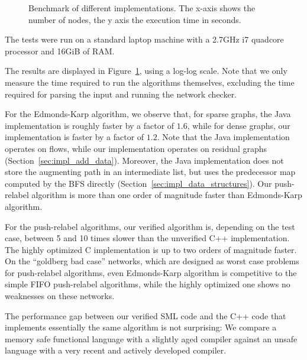 \documentclass[smallcondensed]{svjour3}     %
\begin{document}
\begin{figure}[!h]
\begin{center}
\end{center}
\caption{Benchmark of different implementations. The x-axis shows the number of nodes, the y axis the execution time in seconds.}\label{fig:benchmark}
\end{figure}


  The tests were run on a standard laptop machine with a 2.7GHz i7 quadcore processor and 16GiB of RAM.
  
  The results are displayed in Figure~\ref{fig:benchmark}, using a log-log scale.
  Note that we only measure the time required to run the algorithms themselves, excluding the time required for parsing the input and running the network checker.
  
  For the Edmonds-Karp algorithm, we observe that, for sparse graphs, the Java implementation is roughly faster by a factor of $1.6$, while for dense graphs, 
  our implementation is faster by a factor of $1.2$. Note that the Java implementation operates on flows, while our implementation 
  operates on residual graphs (\cf Section~\ref{sec:impl_add_data}). Moreover, the Java implementation does not store the augmenting 
  path in an intermediate list, but uses the predecessor map computed by the BFS directly (\cf Section~\ref{sec:impl_data_structures}).
  Our push-relabel algorithm is more than one order of magnitude faster than Edmonds-Karp algorithm.
  
  For the push-relabel algorithms, our verified algorithm is, depending on the test case, between 5 and 10 times slower than the unverified C++ implementation.
  The highly optimized C implementation is up to two orders of magnitude faster. 
  On the ``goldberg bad case'' networks, which are designed as worst case problems for push-relabel algorithms, 
  even Edmonds-Karp algorithm is competitive to the simple FIFO push-relabel algorithms, while the highly optimized one shows no weaknesses on these networks.
  
  The performance gap between our verified SML code and the C++ code that implements essentially the same algorithm is not surprising: We compare a 
  memory safe functional language with a slightly aged compiler against an unsafe language with a very recent and actively developed compiler.
  
\end{document}

